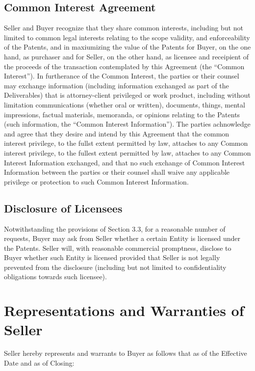 \documentclass[letterpaper,10pt,openany,oneside,english]{sphinxmanual}
\begin{document}
\subsection{Common Interest Agreement}
\label{\detokenize{5-additionalobligations:common-interest-agreement}}
Seller and Buyer recognize that they share common interests, including but not limited to common legal interests relating to the scope validity, and enforceability of the Patents, and in maxiumizing the value of the Patents for Buyer, on the one hand, as purchaser and for Seller, on the other hand, as licensee and receipient of the proceeds of the transaction contemplated by this Agreement (the “Common Interest”). In furtherance of the Common Interest, the parties or their counsel may exchange information (including information exchanged as part of the Deliverables) that is attorney-client privileged or work product, including without limitation communications (whether oral or written), documents, things, mental impressions, factual materials, memoranda, or opinions relating to the Patents (such information, the “Common Interest Information”). The parties achnowledge and agree that they desire and intend by this Agreement that the common interest privilege, to the fullst extent permitted by law, attaches to any Common interest privilege, to the fullest extent permitted by law, attaches to any Common Interest Information exchanged, and that no such exchange of Common Interest Information between the parties or their counsel shall waive any applicable privilege or protection to such Common Interest Information.


\subsection{Disclosure of Licensees}
\label{\detokenize{5-additionalobligations:disclosure-of-licensees}}
Notwithstanding the provisions of Section 3.3, for a reasonable number of requests, Buyer may ask from Seller whether a certain Entity is licensed under the Patents. Seller will, with reasonable commercial promptness, disclose to Buyer whether such Entity is licensed provided that Seller is not legally prevented from the disclosure (including but not limited to confidentiality obligations towards such licensee).


\section{Representations and Warranties of Seller}
\label{\detokenize{6-representations:representations-and-warranties-of-seller}}\label{\detokenize{6-representations::doc}}
Seller hereby represents and warrants to Buyer as follows that as of the Effective Date and as of Closing:
\end{document}
